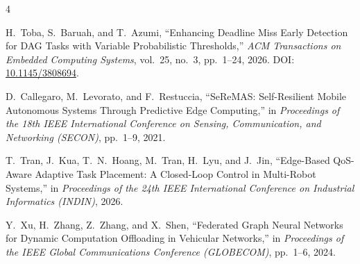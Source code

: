 \documentclass[10pt,conference]{IEEEtran}
\begin{document}
\begin{thebibliography}{4}

H.~Toba, S.~Baruah, and T.~Azumi,
``Enhancing Deadline Miss Early Detection for DAG Tasks with Variable Probabilistic Thresholds,''
\textit{ACM Transactions on Embedded Computing Systems},
vol.~25, no.~3, pp.~1--24, 2026.
\newblock DOI: \href{https://doi.org/10.1145/3808694}{10.1145/3808694}.

D.~Callegaro, M.~Levorato, and F.~Restuccia,
``SeReMAS: Self-Resilient Mobile Autonomous Systems Through Predictive Edge Computing,''
in \textit{Proceedings of the 18th IEEE International Conference on Sensing, Communication, and Networking (SECON)},
pp.~1--9, 2021.

T.~Tran, J.~Kua, T.~N.~Hoang, M.~Tran, H.~Lyu, and J.~Jin,
``Edge-Based QoS-Aware Adaptive Task Placement: A Closed-Loop Control in Multi-Robot Systems,''
in \textit{Proceedings of the 24th IEEE International Conference on Industrial Informatics (INDIN)},
2026.

Y.~Xu, H.~Zhang, Z.~Zhang, and X.~Shen,
``Federated Graph Neural Networks for Dynamic Computation Offloading in Vehicular Networks,''
in \textit{Proceedings of the IEEE Global Communications Conference (GLOBECOM)},
pp.~1--6, 2024.

\end{thebibliography}
\end{document}

